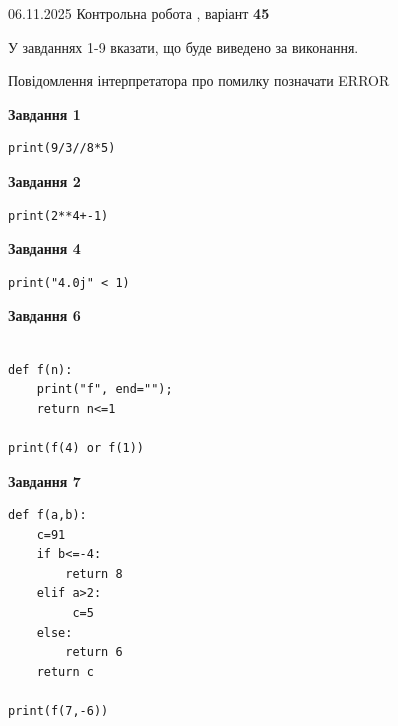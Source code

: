 \documentclass[12pt, ukrainian]{article}
\begin{document}
{\Large{06.11.2025 Контрольна робота , варіант  \No \textbf { 45 }\par}}
{
\begin {large}
У завданнях 1-9 вказати, що буде виведено за виконання.

Повідомлення інтерпретатора про помилку позначати ERROR

\begin{minipage}[t]{7.5cm}

\begin{center}
\textbf{Завдання 1}
\end{center}

\begin{verbatim}
print(9/3//8*5)
\end{verbatim}



\begin{center}
\textbf{Завдання 2}
\end{center}

\begin{verbatim}
print(2**4+-1)
\end{verbatim}



\begin{center}
\textbf{Завдання 4}
\end{center}

\begin{verbatim}
print("4.0j" < 1)
\end{verbatim}



\begin{center}
\textbf{Завдання 6}
\end{center}

\begin{verbatim}

def f(n):
    print("f", end="");
    return n<=1

print(f(4) or f(1))
\end{verbatim}



\begin{center}
\textbf{Завдання 7}
\end{center}

\begin{verbatim}
def f(a,b):
    c=91
    if b<=-4:
        return 8
    elif a>2:
         c=5
    else: 
        return 6
    return c

print(f(7,-6))
\end{verbatim}


\end{minipage}
\end{large}}
\end{document}
